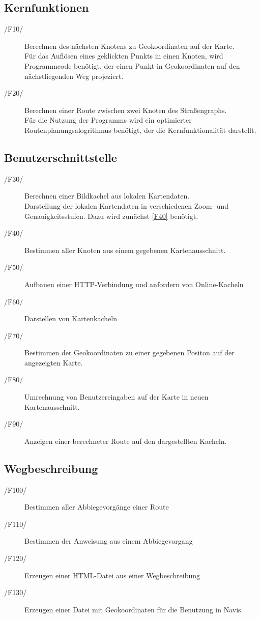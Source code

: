 \documentclass[a4paper, 11pt]{article}
\begin{document}
\subsection{Kernfunktionen}
\begin{description}
\item [/F10/]
Berechnen des nächsten Knotens zu Geokoordinaten auf der Karte.\\
Für das Auflösen eines geklickten Punkts in einen Knoten, wird Programmcode benötigt, der einen Punkt in Geokoordinaten auf den nächstliegenden Weg projeziert.
\item[/F20/]
Berechnen einer Route zwischen zwei Knoten des Straßengraphs.\\
Für die Nutzung der Programms wird ein optimierter Routenplanungsalogrithmus benötigt, der die Kernfunktionalität darstellt.
\end{description}
\subsection{Benutzerschnittstelle}
\begin{description}
\item[/F30/]
Berechnen einer Bildkachel aus lokalen Kartendaten.\\
Darstellung der lokalen Kartendaten in verschiedenen Zoom- und Genauigkeitsstufen. Dazu wird zunächst \ref{F40} benötigt.
\item[/F40/\label{F40}]
Bestimmen aller Knoten aus einem gegebenen Kartenausschnitt.\\

\item[/F50/]
Aufbauen einer HTTP-Verbindung und anfordern von Online-Kacheln
\item[/F60/]
Darstellen von Kartenkacheln
\item[/F70/]
Bestimmen der Geokoordinaten zu einer gegebenen Positon auf der angezeigten Karte.
\item[/F80/]
Umrechnung von Benutzereingaben auf der Karte in neuen Kartenausschnitt.
\item[/F90/]
Anzeigen einer berechneter Route auf den dargestellten Kacheln.
\end{description}
\subsection{Wegbeschreibung}
\begin{description}
\item[/F100/]
Bestimmen aller Abbiegevorgänge einer Route
\item[/F110/]
Bestimmen der Anweisung aus einem Abbiegevorgang
\item[/F120/]
Erzeugen einer HTML-Datei aus einer Wegbeschreibung
\item[/F130/]
Erzeugen einer Datei mit Geokoordinaten für die Benutzung in Navis.
\end{description}
\end{document}
